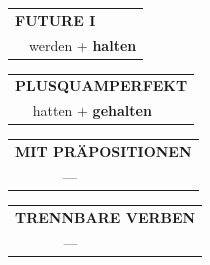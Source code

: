 \documentclass[10pt,a4paper]{revtex4-2}
\begin{document}
\begin{verbbox}
\begin{tabular}{rl}
    \multicolumn{2}{l}{\textbf{FUTURE I} }\\
   & werden + \textbf{halten}\\
 
  \end{tabular}
\hfill
   \begin{tabular}{rl}
      \multicolumn{2}{l}{\textbf{PLUSQUAMPERFEKT}}\\
   & hatten + \textbf{gehalten}\\
  \end{tabular}
  
  \vspace{10pt}



\begin{tabular}{lll}
\multicolumn{3}{l}{\textbf{MIT PRÄPOSITIONEN}}\\
& ---\\
\end{tabular}
\hfill
\begin{tabular}{lll}
\multicolumn{3}{l}{\textbf{TRENNBARE VERBEN}}\\
& ---\\
\end{tabular}

  \vspace{-5pt}

\end{verbbox}
\end{document}
